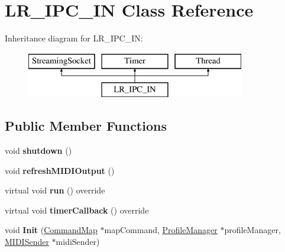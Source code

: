 \hypertarget{class_l_r___i_p_c___i_n}{}\section{L\+R\+\_\+\+I\+P\+C\+\_\+\+IN Class Reference}
\label{class_l_r___i_p_c___i_n}
Inheritance diagram for L\+R\+\_\+\+I\+P\+C\+\_\+\+IN\+:\begin{figure}[H]
\begin{center}
\leavevmode
\includegraphics[height=2.000000cm]{class_l_r___i_p_c___i_n}
\end{center}
\end{figure}
\subsection*{Public Member Functions}
\begin{DoxyCompactItemize}
\item 
void {\bfseries shutdown} ()\hypertarget{class_l_r___i_p_c___i_n_a1eeca511d978f03330310e601390ddcc}{}\label{class_l_r___i_p_c___i_n_a1eeca511d978f03330310e601390ddcc}

\item 
void {\bfseries refresh\+M\+I\+D\+I\+Output} ()\hypertarget{class_l_r___i_p_c___i_n_af51e690dc3bc4e84d652642e5f2f1141}{}\label{class_l_r___i_p_c___i_n_af51e690dc3bc4e84d652642e5f2f1141}

\item 
virtual void {\bfseries run} () override\hypertarget{class_l_r___i_p_c___i_n_a328f5058bbfdbeba4345cc4d0b159bbb}{}\label{class_l_r___i_p_c___i_n_a328f5058bbfdbeba4345cc4d0b159bbb}

\item 
virtual void {\bfseries timer\+Callback} () override\hypertarget{class_l_r___i_p_c___i_n_acdeca8e06bd01cb71ea026fca630823c}{}\label{class_l_r___i_p_c___i_n_acdeca8e06bd01cb71ea026fca630823c}

\item 
void {\bfseries Init} (\hyperlink{class_command_map}{Command\+Map} $\ast$map\+Command, \hyperlink{class_profile_manager}{Profile\+Manager} $\ast$profile\+Manager, \hyperlink{class_m_i_d_i_sender}{M\+I\+D\+I\+Sender} $\ast$midi\+Sender)\hypertarget{class_l_r___i_p_c___i_n_aa4519a3c52332bbc21ebd03a2a2c4411}{}\label{class_l_r___i_p_c___i_n_aa4519a3c52332bbc21ebd03a2a2c4411}

\end{DoxyCompactItemize}


